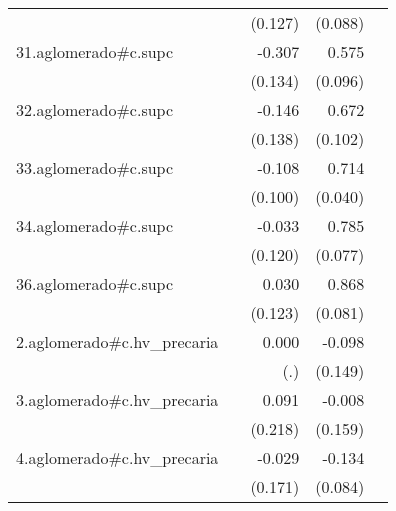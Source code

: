{\begin{longtable}{l*{4}{D{.}{.}{-1}}}
            &                     &     (0.127)         &     (0.088)         &                     \\
\addlinespace
31.aglomerado#c.supc&                     &      -0.307\sym{*}  &       0.575\sym{***}&                     \\
            &                     &     (0.134)         &     (0.096)         &                     \\
\addlinespace
32.aglomerado#c.supc&                     &      -0.146         &       0.672\sym{***}&                     \\
            &                     &     (0.138)         &     (0.102)         &                     \\
\addlinespace
33.aglomerado#c.supc&                     &      -0.108         &       0.714\sym{***}&                     \\
            &                     &     (0.100)         &     (0.040)         &                     \\
\addlinespace
34.aglomerado#c.supc&                     &      -0.033         &       0.785\sym{***}&                     \\
            &                     &     (0.120)         &     (0.077)         &                     \\
\addlinespace
36.aglomerado#c.supc&                     &       0.030         &       0.868\sym{***}&                     \\
            &                     &     (0.123)         &     (0.081)         &                     \\
\addlinespace
2.aglomerado#c.hv\_precaria&                     &       0.000         &      -0.098         &                     \\
            &                     &         (.)         &     (0.149)         &                     \\
\addlinespace
3.aglomerado#c.hv\_precaria&                     &       0.091         &      -0.008         &                     \\
            &                     &     (0.218)         &     (0.159)         &                     \\
\addlinespace
4.aglomerado#c.hv\_precaria&                     &      -0.029         &      -0.134         &                     \\
            &                     &     (0.171)         &     (0.084)         &                     \\

\end{longtable}}
